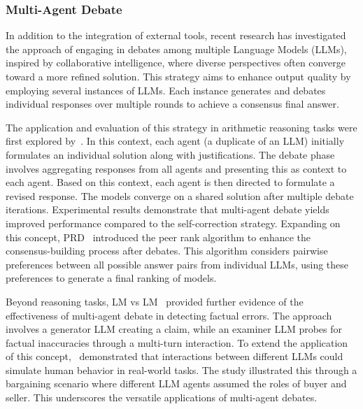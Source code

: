 \documentclass[12pt]{extarticle}
\begin{document}
\subsubsection{Multi-Agent Debate}
In addition to the integration of external tools, recent research has investigated the approach of engaging in debates among multiple Language Models (LLMs), inspired by collaborative intelligence, where diverse perspectives often converge toward a more refined solution. This strategy aims to enhance output quality by employing several instances of LLMs. Each instance generates and debates individual responses over multiple rounds to achieve a consensus final answer.

The application and evaluation of this strategy in arithmetic reasoning tasks were first explored by~\cite{du2023improving}. In this context, each agent (a duplicate of an LLM) initially formulates an individual solution along with justifications. The debate phase involves aggregating responses from all agents and presenting this as context to each agent. Based on this context, each agent is then directed to formulate a revised response. The models converge on a shared solution after multiple debate iterations. Experimental results demonstrate that multi-agent debate yields improved performance compared to the self-correction strategy. Expanding on this concept, PRD~\cite{li2023prd} introduced the peer rank algorithm to enhance the consensus-building process after debates. This algorithm considers pairwise preferences between all possible answer pairs from individual LLMs, using these preferences to generate a final ranking of models.

Beyond reasoning tasks, LM vs LM~\cite{cohen2023lm} provided further evidence of the effectiveness of multi-agent debate in detecting factual errors. The approach involves a generator LLM creating a claim, while an examiner LLM probes for factual inaccuracies through a multi-turn interaction. To extend the application of this concept,~\cite{fu2023improving} demonstrated that interactions between different LLMs could simulate human behavior in real-world tasks. The study illustrated this through a bargaining scenario where different LLM agents assumed the roles of buyer and seller. This underscores the versatile applications of multi-agent debates.

\newpage


\end{document}

